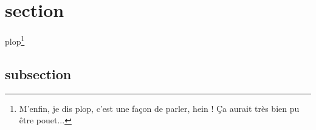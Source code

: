 \section{section}
	\lipsum[1]
plop\footnote{M'enfin, je dis plop, c'est une façon de parler, hein ! Ça aurait très bien pu être pouet...}

\subsection{subsection}
	\lipsum[1]